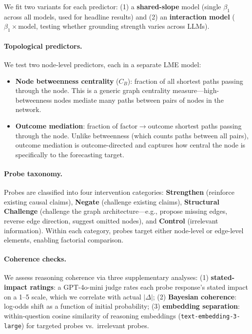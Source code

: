 \documentclass[11pt]{article}
\begin{document}
We fit two variants for each predictor: (1) a \textbf{shared-slope} model (single $\beta_1$ across all models, used for headline results) and (2) an \textbf{interaction model} ($\beta_1 \times \text{model}$, testing whether grounding strength varies across LLMs).

\paragraph{Topological predictors.}
We test two node-level predictors, each in a separate LME model:

\begin{itemize}
    \item \textbf{Node betweenness centrality} ($C_B$): fraction of all shortest paths passing through the node. This is a generic graph centrality measure---high-betweenness nodes mediate many paths between pairs of nodes in the network.
    \item \textbf{Outcome mediation}: fraction of factor$\rightarrow$outcome shortest paths passing through the node. Unlike betweenness (which counts paths between all pairs), outcome mediation is outcome-directed and captures how central the node is specifically to the forecasting target.
\end{itemize}

\paragraph{Probe taxonomy.}
Probes are classified into four intervention categories: \textbf{Strengthen} (reinforce existing causal claims), \textbf{Negate} (challenge existing claims), \textbf{Structural Challenge} (challenge the graph architecture---e.g., propose missing edges, reverse edge direction, suggest omitted nodes), and \textbf{Control} (irrelevant information). Within each category, probes target either node-level or edge-level elements, enabling factorial comparison.

\paragraph{Coherence checks.}
We assess reasoning coherence via three supplementary analyses: (1) \textbf{stated-impact ratings}: a GPT-4o-mini judge rates each probe response's stated impact on a 1--5 scale, which we correlate with actual $|\Delta|$; (2) \textbf{Bayesian coherence}: log-odds shift as a function of initial probability; (3) \textbf{embedding separation}: within-question cosine similarity of reasoning embeddings (\texttt{text-embedding-3-large}) for targeted probes vs.\ irrelevant probes.
\end{document}
